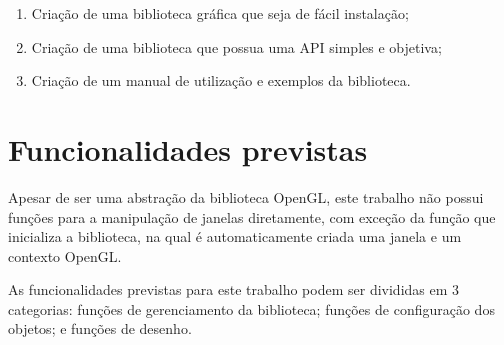 \documentclass[12pt, %
openright,
oneside, %
a4paper,    %
brazil]{facom-ufu-abntex2}
\begin{document}
\begin{enumerate}
\item Criação de uma biblioteca gráfica que seja de fácil instalação;
\item Criação de uma biblioteca que possua uma API simples e objetiva;
\item Criação de um manual de utilização e exemplos da biblioteca.
\end{enumerate}

\section{Funcionalidades previstas}
Apesar de ser uma abstração da biblioteca OpenGL, este trabalho não possui funções para a manipulação de janelas diretamente, com exceção da função que inicializa a biblioteca, na qual é automaticamente criada uma janela e um contexto OpenGL.

As funcionalidades previstas para este trabalho podem ser divididas em 3 categorias: funções de gerenciamento da biblioteca; funções de configuração dos objetos; e funções de desenho.
\end{document}
